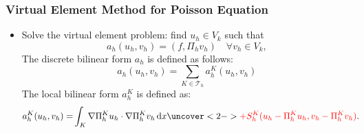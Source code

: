 \documentclass[notheorems,serif]{beamer}
\newcommand{\highlightit}{\textcolor[rgb]{1.00,0.00,0.00}}
\begin{document}
\begin{CJK}{UTF8}{gkai}
\begin{frame}
    \frametitle{Virtual Element Method for Poisson Equation}
    \begin{itemize}
\item Solve the virtual element problem: find $u_h \in V_k$ such that
$$
a_h(u_h, v_h) = (f, \Pi_h v_h) \quad \forall v_h \in V_k,
$$
The discrete bilinear form $a_h$ is defined as follows:
$$
a_h(u_h, v_h) = \sum_{K \in \mathcal{T}_h} a_h^K(u_h, v_h) 
$$
The local bilinear form $a_h^K$ is defined as:
$$
\begin{aligned}
a_h^K(u_h, v_h) = & \int_K \nabla \Pi_h^K u_h \cdot \nabla \Pi_h^K v_h \, \mathrm{d}
x
\uncover<2->{
\highlightit{+ S_h^K(u_h - \Pi_h^K u_h, v_h - \Pi_h^K v_h)}.
}
\end{aligned}
$$
\end{itemize}
\end{frame}


\end{CJK}
\end{document}
